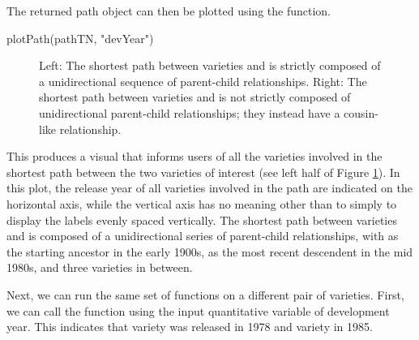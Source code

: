 \documentclass[article,shortnames]{jss}
\begin{document}
The returned path object can then be plotted using the  function.

\begin{Code}
plotPath(pathTN, "devYear")
\end{Code}

\begin{figure}[h]
    \centering
    \caption{Left: The shortest path between varieties  and  is strictly composed of a unidirectional sequence of parent-child relationships. Right: The shortest path between varieties  and  is not strictly composed of unidirectional parent-child relationships; they instead have a cousin-like relationship.}
    \label{fig:pathTNZB}
\end{figure}

This produces a visual that informs users of all the varieties involved in the shortest path between the two varieties of interest (see left half of Figure \ref{fig:pathTNZB}). In this plot, the release year of all varieties involved in the path are indicated on the horizontal axis, while the vertical axis has no meaning other than to simply to display the labels evenly spaced vertically. The shortest path between varieties  and  is composed of a unidirectional series of parent-child relationships, with  as the starting ancestor in the early 1900s,  as the most recent descendent in the mid 1980s, and three varieties in between.

Next, we can run the same set of functions on a different pair of varieties. First, we can call the  function  using the input quantitative variable of development year. This indicates that variety  was released in 1978 and variety  in 1985.
\end{document}
